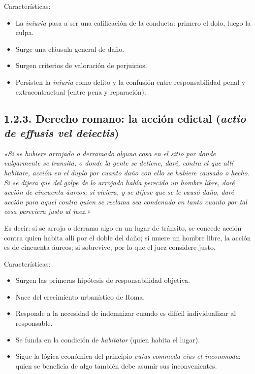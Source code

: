 Características:

\begin{itemize}
\item La \textit{iniuria} pasa a ser una calificación de la conducta: primero el dolo, luego la culpa.
\item Surge una cláusula general de daño.
\item Surgen criterios de valoración de perjuicios.
\item Persisten la \textit{iniuria} como delito y la confusión entre responsabilidad penal y extracontractual (entre pena y reparación).
\end{itemize}
\subsection{1.2.3. Derecho romano: la acción edictal (\textit{actio de effusis vel deiectis})}
\begin{cita}
\textit{«Si se hubiere arrojado o derramado alguna cosa en el sitio por donde vulgarmente se transita, o donde la gente se detiene, daré, contra el que allí habitare, acción en el duplo por cuanto daño con ello se hubiere causado o hecho. Si se dijera que del golpe de lo arrojado había perecido un hombre libre, daré acción de cincuenta áureos; si viviera, y se dijese que se le causó daño, daré acción para aquel contra quien se reclama sea condenado en tanto cuanto por tal cosa pareciera justo al juez.»}
\end{cita}
Es decir: si se arroja o derrama algo en un lugar de tránsito, se concede acción contra quien habita allí por el doble del daño; si muere un hombre libre, la acción es de cincuenta áureos; si sobrevive, por lo que el juez considere justo.

Características:

\begin{itemize}
\item Surgen las primeras hipótesis de responsabilidad objetiva.
\item Nace del crecimiento urbanístico de Roma.
\item Responde a la necesidad de indemnizar cuando es difícil individualizar al responsable.
\item Se funda en la condición de \textit{habitator} (quien habita el lugar).
\item Sigue la lógica económica del principio \textit{cuius commoda eius et incommoda}: quien se beneficia de algo también debe asumir sus inconvenientes.
\end{itemize}
